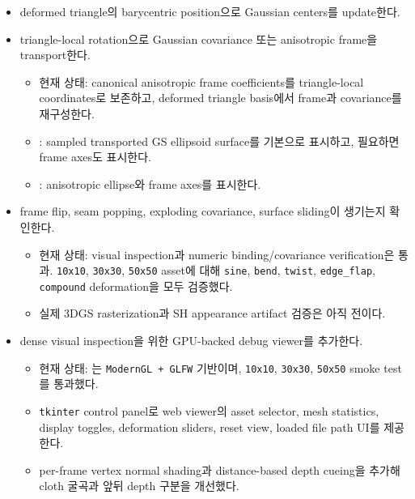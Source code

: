 \documentclass[10pt]{article}
\newcommand{\progress}{\textcolor{ProgressBlue}{[{\raisebox{0.1ex}{\(\sim\)}}]}}
\newcommand{\done}{\textcolor{DoneGreen}{\(\boxtimes\)}}
\newcommand{\code}[1]{\texttt{#1}}
\begin{document}
\begin{itemize}
\begin{itemize}
      \item edge flap
      \item compound
      \item 현재 상태: 와  모두 UI에서 \code{sine}, \code{bend}, \code{twist}, \code{edge\_flap}, \code{compound}를 선택할 수 있다.
    \end{itemize}
  \item[\done] deformed triangle의 barycentric position으로 Gaussian centers를 update한다.
  \item[\done] triangle-local rotation으로 Gaussian covariance 또는 anisotropic frame을 transport한다.
    \begin{itemize}
      \item 현재 상태: canonical anisotropic frame coefficients를 triangle-local coordinates로 보존하고, deformed triangle basis에서 frame과 covariance를 재구성한다.
      \item {}: sampled transported GS ellipsoid surface를 기본으로 표시하고, 필요하면 frame axes도 표시한다.
      \item {}: anisotropic ellipse와 frame axes를 표시한다.
    \end{itemize}
  \item[\progress] frame flip, seam popping, exploding covariance, surface sliding이 생기는지 확인한다.
    \begin{itemize}
      \item 현재 상태: visual inspection과 numeric binding/covariance verification은 통과. \code{10x10}, \code{30x30}, \code{50x50} asset에 대해 \code{sine}, \code{bend}, \code{twist}, \code{edge\_flap}, \code{compound} deformation을 모두 검증했다.
      \item 실제 3DGS rasterization과 SH appearance artifact 검증은 아직 전이다.
    \end{itemize}
  \item[\done] dense visual inspection을 위한 GPU-backed debug viewer를 추가한다.
    \begin{itemize}
      \item 현재 상태: 는 \code{ModernGL + GLFW} 기반이며, \code{10x10}, \code{30x30}, \code{50x50} smoke test를 통과했다.
      \item \code{tkinter} control panel로 web viewer의 asset selector, mesh statistics, display toggles, deformation sliders, reset view, loaded file path UI를 제공한다.
      \item per-frame vertex normal shading과 distance-based depth cueing을 추가해 cloth 굴곡과 앞뒤 depth 구분을 개선했다.

\end{itemize}
\end{itemize}
\end{document}
